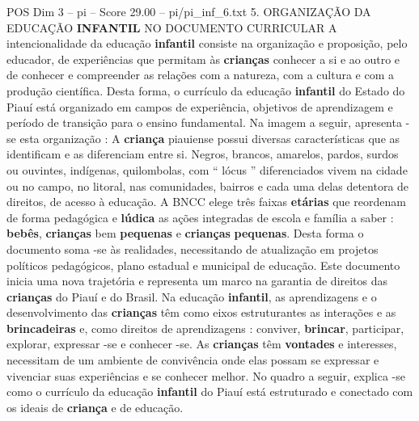 \begin{textsample}{POS Dim 3 – pi – Score 29.00 – pi/pi\_inf\_6.txt}  \label{ex:f3_pos_251}
5.
ORGANIZAÇÃO DA EDUCAÇÃO \textbf{INFANTIL} NO DOCUMENTO CURRICULAR A intencionalidade da educação \textbf{infantil} consiste na organização e proposição, pelo educador, de experiências que permitam às \textbf{crianças} conhecer a si e ao outro e de conhecer e compreender as relações com a natureza, com a cultura e com a produção científica.
Desta forma, o currículo da educação \textbf{infantil} do Estado do Piauí está organizado em campos de experiência, objetivos de aprendizagem e período de transição para o ensino fundamental.
Na imagem a seguir, apresenta -se esta organização : A \textbf{criança} piauiense possui diversas características que as identificam e as diferenciam entre si.
Negros, brancos, amarelos, pardos, surdos ou ouvintes, indígenas, quilombolas, com “ lócus ” diferenciados vivem na cidade ou no campo, no litoral, nas comunidades, bairros e cada uma delas detentora de direitos, de acesso à educação.
A BNCC elege três faixas \textbf{etárias} que reordenam de forma pedagógica e \textbf{lúdica} as ações integradas de escola e família a saber : \textbf{bebês}, \textbf{crianças} bem \textbf{pequenas} e \textbf{crianças} \textbf{pequenas}.
Desta forma o documento soma -se às realidades, necessitando de atualização em projetos políticos pedagógicos, plano estadual e municipal de educação.
Este documento inicia uma nova trajetória e representa um marco na garantia de direitos das \textbf{crianças} do Piauí e do Brasil.
Na educação \textbf{infantil}, as aprendizagens e o desenvolvimento das \textbf{crianças} têm como eixos estruturantes as interações e as \textbf{brincadeiras} e, como direitos de aprendizagens : conviver, \textbf{brincar}, participar, explorar, expressar -se e conhecer -se.
As \textbf{crianças} têm \textbf{vontades} e interesses, necessitam de um ambiente de convivência onde elas possam se expressar e vivenciar suas experiências e se conhecer melhor.
No quadro a seguir, explica -se como o currículo da educação \textbf{infantil} do Piauí está estruturado e conectado com os ideais de \textbf{criança} e de educação.

\end{textsample}

